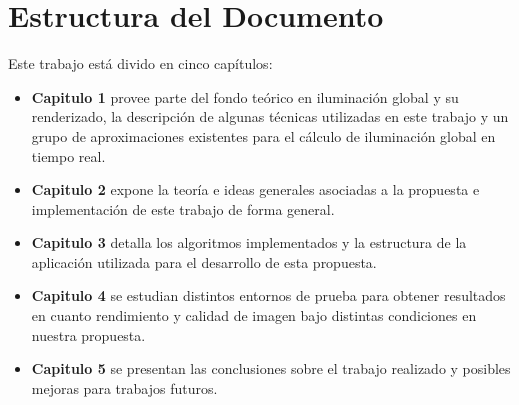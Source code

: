 \section*{Estructura del Documento} %
\label{sec:estructura_del_documento}
Este trabajo está divido en cinco capítulos:
\begin{itemize}
\item \textbf{Capitulo 1} provee parte del fondo teórico en iluminación global y su renderizado, la descripción de algunas técnicas utilizadas en este trabajo y un grupo de aproximaciones existentes para el cálculo de iluminación global en tiempo real.
\item \textbf{Capitulo 2} expone la teoría e ideas generales asociadas a la propuesta e implementación de este trabajo de forma general.
\item \textbf{Capitulo 3} detalla los algoritmos implementados y la estructura de la aplicación utilizada para el desarrollo de esta propuesta.
\item \textbf{Capitulo 4} se estudian distintos entornos de prueba para obtener resultados en cuanto rendimiento y calidad de imagen bajo distintas condiciones en nuestra propuesta.
\item \textbf{Capitulo 5} se presentan las conclusiones sobre el trabajo realizado y posibles mejoras para trabajos futuros.
\end{itemize}
